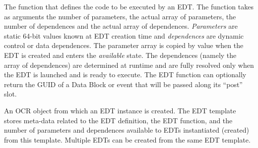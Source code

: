%
%
\glossarydefstart
The function that defines the code to be executed by an EDT. The function
takes as arguments the number of parameters, the actual array of
parameters, the number of dependences and the actual array of
dependences. \emph{Parameters} are static 64-bit values known at EDT
creation time and \emph{dependences} are dynamic control or data
dependences. The parameter array is copied by value when the EDT is
created and enters the \emph{available} state. The dependences (namely the array of dependences) are
determined at runtime and are fully resolved only when the EDT is launched and
is ready to execute. The EDT function can optionally return the GUID of a Data Block or
event that will be passed along its ``post'' slot.

\glossarydefend
{}
\glossarydefstart
An OCR object from which an EDT instance is created. The EDT template
stores meta-data related to the EDT definition, the EDT function, and
the number of parameters and dependences available to EDTs
instantiated (created) from this template. Multiple EDTs can be created from the
same EDT template.
\glossarydefend


